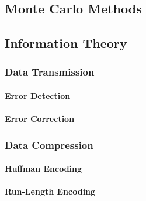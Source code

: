 \subsection{Monte Carlo Methods}


\subsection{Information Theory}


\subsubsection{Data Transmission}

\paragraph{Error Detection}

\paragraph{Error Correction}

\subsubsection{Data Compression}

\paragraph{Huffman Encoding}

\paragraph{Run-Length Encoding}






\begin{comment}

- Monte Carlo Methods

\end{comment}